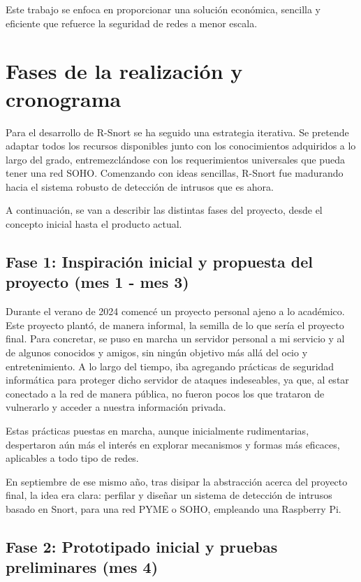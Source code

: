 \documentclass[11pt,a4paper,twoside]{report}
\begin{document}
Este trabajo se enfoca en proporcionar una solución económica, sencilla y eficiente que refuerce la seguridad de redes a menor escala.

\section{Fases de la realización y cronograma}

Para el desarrollo de R-Snort se ha seguido una estrategia iterativa. Se pretende adaptar todos los recursos disponibles junto con los conocimientos adquiridos a lo largo del grado, entremezclándose con los requerimientos universales que pueda tener una red SOHO. Comenzando con ideas sencillas, R-Snort fue madurando hacia el sistema robusto de detección de intrusos que es ahora.\newline

A continuación, se van a describir las distintas fases del proyecto, desde el concepto inicial hasta el producto actual.

\subsection{Fase 1: Inspiración inicial y propuesta del proyecto (mes 1 - mes 3)}

Durante el verano de 2024 comencé un proyecto personal ajeno a lo académico. Este proyecto plantó, de manera informal, la semilla de lo que sería el proyecto final. Para concretar, se puso en marcha un servidor personal a mi servicio y al de algunos conocidos y amigos, sin ningún objetivo más allá del ocio y entretenimiento. A lo largo del tiempo, iba agregando prácticas de seguridad informática para proteger dicho servidor de ataques indeseables, ya que, al estar conectado a la red de manera pública, no fueron pocos los que trataron de vulnerarlo y acceder a nuestra información privada.\newline

Estas prácticas puestas en marcha, aunque inicialmente rudimentarias, despertaron aún más el interés en explorar mecanismos y formas más eficaces, aplicables a todo tipo de redes.\newline

En septiembre de ese mismo año, tras disipar la abstracción acerca del proyecto final, la idea era clara: perfilar y diseñar un sistema de detección de intrusos basado en Snort, para una red PYME o SOHO, empleando una Raspberry Pi.

\subsection{Fase 2: Prototipado inicial y pruebas preliminares (mes 4)}
\end{document}

